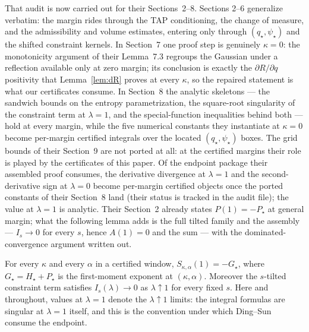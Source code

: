 That audit is now carried out for their Sections~2--8.  Sections
2--6 generalize verbatim: the margin rides through the TAP
conditioning, the change of measure, and the admissibility and
volume estimates, entering only through $(q_\star,\psi_\star)$ and
the shifted constraint kernels.  In Section~7 one proof step is
genuinely $\kappa=0$: the monotonicity argument of their Lemma~7.3
regroups the Gaussian under a reflection available only at zero
margin; its conclusion is exactly the $\partial R/\partial q$
positivity that Lemma~\ref{lem:dR} proves at every $\kappa$, so the
repaired statement is what our certificates consume.  In Section~8
the analytic skeletons --- the sandwich bounds on the entropy
parametrization, the square-root singularity of the constraint term
at $\lambda=1$, and the special-function inequalities behind both
--- hold at every margin, while the five numerical constants they
instantiate at $\kappa=0$ become per-margin certified integrals over
the located $(q_\star,\psi_\star)$ boxes.  The grid bounds of their
Section~9 are not ported at all: at the certified margins their role
is played by the certificates of this paper.  Of the endpoint
package their assembled proof consumes, the derivative divergence at
$\lambda=1$ and the second-derivative sign at $\lambda=0$ become
per-margin certified objects once the ported constants of their
Section~8 land (their status is tracked in the audit file); the
value at $\lambda=1$ is analytic.  Their Section~2 already states
$P(1)=-P_\star$ at general margin; what the following lemma adds is
the full tilted family and the assembly --- $I_s\to0$ for every
$s$, hence $A(1)=0$ and the sum --- with the dominated-convergence
argument written out.

\begin{lemma}\label{lem:S1}
For every $\kappa$ and every $\alpha$ in a certified window,
$S_{\kappa,\alpha}(1)=-G_\star$, where
$G_\star=H_\star+P_\star$ is the first-moment exponent at
$(\kappa,\alpha)$.  Moreover the $s$-tilted constraint term
satisfies $I_s(\lambda)\to0$ as $\lambda\uparrow1$ for every fixed
$s$.  Here and throughout, values at $\lambda=1$ denote the
$\lambda\uparrow1$ limits: the integral formulas are singular at
$\lambda=1$ itself, and this is the convention under which
Ding--Sun consume the endpoint.
\end{lemma}

